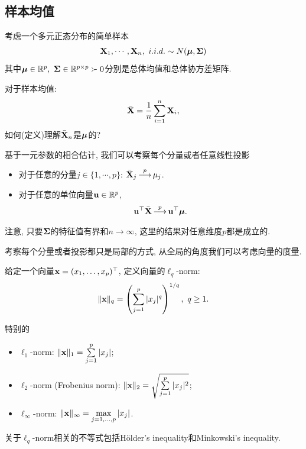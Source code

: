 \subsection{样本均值}
考虑一个多元正态分布的简单样本
\begin{align*}
	{\bf X}_1,\cdots, {\bf X}_n,~i.i.d.\sim N(\mbox{\boldmath $\mu$}, \mbox{\boldmath $\Sigma$})
\end{align*}	
其中$\mbox{\boldmath $\mu$} \in \mathbb{R}^p,~\mbox{\boldmath $\Sigma$} \in \mathbb{R}^{p \times p} \succ 0$分别是总体均值和总体协方差矩阵.

\begin{ques}
	对于样本均值:
	\begin{align*}
		\bar{{\bf X}}=\frac{1}{n} \sum_{i=1}^n {\bf X}_i,
	\end{align*}	
	如何(定义)理解$\bar{{\bf X}}_n$是$\mbox{\boldmath $\mu$}$的? 
\end{ques}
\bigskip

基于一元参数的相合估计, 我们可以考察每个分量或者任意线性投影
\begin{itemize}
	\item 对于任意的分量$j \in \{1,\cdots,p\}$:  $\bar{\X}_j \topr \mu_j$.
	\item 对于任意的单位向量${\bf u} \in \mathbb{R}^p$, 
	\begin{align*}
		\u \trans \bar{\X} \topr \u \trans \bmu.
	\end{align*}
\end{itemize}
注意, 只要$\mbox{\boldmath $\Sigma$}$的特征值有界和$n \to \infty$, 这里的结果对任意维度$p$都是成立的.
\bigskip


考察每个分量或者投影都只是局部的方式, 从全局的角度我们可以考虑向量的度量.
\begin{defin}
给定一个向量${\bf x}=(x_1,\ldots,x_p)^\top$, 定义向量的$\ell_q$-norm:
\begin{align*}
	\|{\bf x}\|_q=\left(\sum_{j=1}^p |x_j|^q  \right)^{1/q},~q\geq 1.
\end{align*}	
\end{defin}
特别的
\begin{itemize}
	\item $\ell_1$-norm: $\|{\bf x}\|_1=\sum \limits_{j=1}^p |x_j|$;
	\item $\ell_2$-norm (Frobenius norm): $\|{\bf x}\|_2=\sqrt{\sum \limits_{j=1}^p |x_j|^2}$;
	\item $\ell_\infty$-norm: $\|{\bf x}\|_\infty=\max\limits_{j=1,\ldots,p} |x_j|$.
\end{itemize}	
关于$\ell_q$-norm相关的不等式包括Hölder's inequality和Minkowski's inequality.
\bigskip

